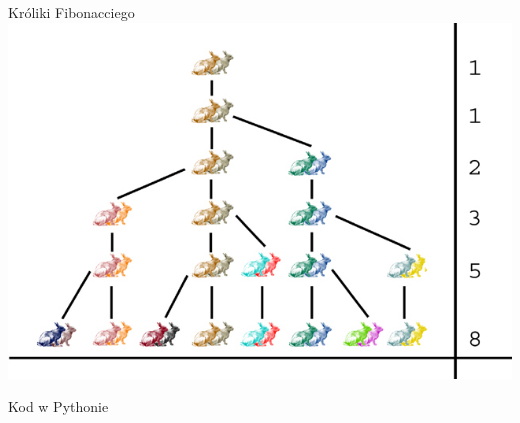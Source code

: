 \begin{frame}{Króliki Fibonacciego}
    \centering
    \includegraphics[height=0.8\textheight]{graphics/recursion/fibonacci_rabbits.jpg}
\end{frame}
\begin{frame}[fragile]{Kod w Pythonie}
    
\end{frame}
